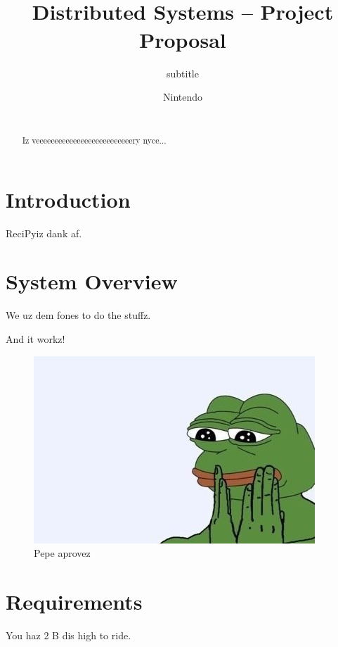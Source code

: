 \documentclass{report}
\title{\name\\
\normalsize{Distributed Systems -- Project Proposal}}
\subtitle{subtitle}
\author{
%
%
\alignauthor \normalsize{Nintendo}\\
	\affaddr{\normalsize{69-666-007}}\\
	\email{\normalsize{awsum@sauce.com}}
}
\newcommand{\name}{ReciPy\texttrademark}
\begin{document}
\maketitle

	\begin{abstract}
		Iz veeeeeeeeeeeeeeeeeeeeeeeeeery nyce...
	\end{abstract}

	\section{Introduction}

	\name iz dank af.

\section{System Overview}

We uz dem fones to do the stuffz.

And it workz!

\begin{figure}[h]
	\centering
    \includegraphics[width=\columnwidth]{satisfied.jpeg}
	\caption{Pepe aprovez}
\end{figure}


\section{Requirements}
	
	You haz 2 B dis high to ride.
	
\end{document}

